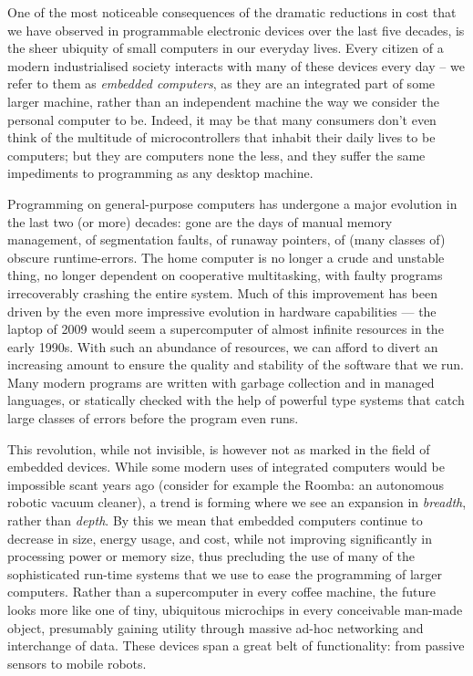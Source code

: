 \documentclass[a4paper, oneside, final]{memoir}
\begin{document}
One of the most noticeable consequences of the dramatic reductions in
cost that we have observed in programmable electronic devices over the
last five decades, is the sheer ubiquity of small computers in our
everyday lives.  Every citizen of a modern industrialised society
interacts with many of these devices every day -- we refer to them as
\textit{embedded computers}, as they are an integrated part of some
larger machine, rather than an independent machine the way we consider
the personal computer to be.  Indeed, it may be that many consumers
don't even think of the multitude of microcontrollers that inhabit
their daily lives to be computers; but they are computers none the
less, and they suffer the same impediments to programming as any
desktop machine.

Programming on general-purpose computers has undergone a major
evolution in the last two (or more) decades: gone are the days of
manual memory management, of segmentation faults, of runaway pointers,
of (many classes of) obscure runtime-errors.  The home computer is no
longer a crude and unstable thing, no longer dependent on cooperative
multitasking, with faulty programs irrecoverably crashing the entire
system.  Much of this improvement has been driven by the even more
impressive evolution in hardware capabilities --- the laptop of 2009
would seem a supercomputer of almost infinite resources in the early
1990s.  With such an abundance of resources, we can afford to divert
an increasing amount to ensure the quality and stability of the
software that we run.  Many modern programs are written with garbage
collection and in managed languages, or statically checked with the
help of powerful type systems that catch large classes of errors
before the program even runs.

This revolution, while not invisible, is however not as marked in the
field of embedded devices.  While some modern uses of integrated
computers would be impossible scant years ago (consider for example
the Roomba: an autonomous robotic vacuum cleaner), a trend is forming
where we see an expansion in \textit{breadth}, rather than
\textit{depth}.  By this we mean that embedded computers continue to
decrease in size, energy usage, and cost, while not improving
significantly in processing power or memory size, thus precluding the
use of many of the sophisticated run-time systems that we use to ease
the programming of larger computers.  Rather than a supercomputer in
every coffee machine, the future looks more like one of tiny,
ubiquitous microchips in every conceivable man-made object, presumably
gaining utility through massive ad-hoc networking and interchange of
data.  These devices span a great belt of functionality: from passive
sensors to mobile robots.
\end{document}
